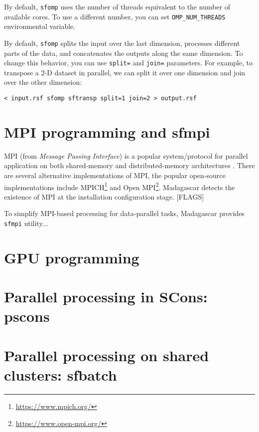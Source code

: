 By default, \texttt{sfomp} uses the number of threads equivalent to
the number of available cores. To use a different number, you can set
\texttt{OMP\_NUM\_THREADS} environmental variable.

By default, \texttt{sfomp} splits the input over the last dimension,
processes different parts of the data, and concatenates the outputs
along the same dimension. To change this behavior, you can use
\texttt{split=} and \texttt{join=} parameters. For example, to
transpose a 2-D dataset in parallel, we can split it over one
dimension and join over the other dimension:
\begin{verbatim}
< input.rsf sfomp sftransp split=1 join=2 > output.rsf
\end{verbatim}


\section{MPI programming and sfmpi}

MPI (from \emph{Message Passing Interface}) is a popular
system/protocol for parallel application on both shared-memory and
distributed-memory architectures \cite[]{pacheco,gropp}. There are several alternative
implementations of MPI, the popular open-source implementations
include MPICH\footnote{\url{https://www.mpich.org/}} and Open
MPI\footnote{\url{https://www.open-mpi.org/}}. Madagascar detects the
existence of MPI at the installation configuration stage. [FLAGS]

To simplify MPI-based processing for data-parallel tasks,
Madagascar provides \texttt{sfmpi} utility...

\section{GPU programming}

\section{Parallel processing in SCons: pscons}

\section{Parallel processing on shared clusters: sfbatch}




